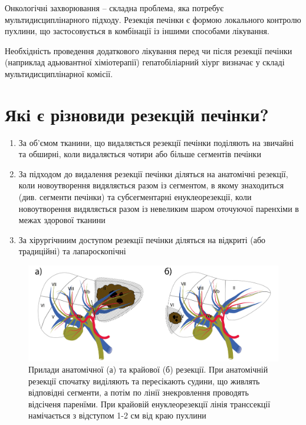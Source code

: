 \begin{tcolorbox}[width=\textwidth,colback=red!5!white,colframe=red!75!black]    
Онкологічні захворювання -- складна проблема, яка потребує мультидисциплінарного підходу. Резекція печінки є формою локального контролю пухлини, що  застосовується в комбінації із іншими способами лікування. 
\end{tcolorbox}    


Необхідність проведення додаткового лікування перед чи після резекції печінки (наприклад адьювантної хіміотерапії) гепатобіліарний хіург визначає у складі  мультидисциплінарної комісії.



\section{Які є різновиди резекцій печінки?}

\begin{enumerate}
    \item За об’ємом тканини, що видаляється резекції печінки поділяють на звичайні та обширні, коли видаляється чотири або більше сегментів печінки
    \item За підходом до видалення резекції печінки діляться на анатомічні резекції, коли новоутворення видяляється разом із сегментом, в якому знаходиться (див. сегменти печінки) та субсегментарні енуклеорезекції, коли новоутворення видяляється разом із невеликим шаром оточуючої паренхіми в межах здорової тканини
    \item За хірургічниим доступом резекції печінки діляться на відкриті (або традиційні) та лапароскопічні 
\end{enumerate}

\begin{figure}
  \includegraphics[width=\linewidth]{Figures/Anatomical vs marginal_Horizontal.png}
  \caption{Прилади анатомічної (а) та крайової (б) резекції. При анатомічній резекції спочатку виділяють та пересікають судини, що живлять відповідні сегменти, а потім по лінії знекровлення проводять відсіченя паренїми. При крайовій енуклеорезекції лінія транссекції намічається з відступом 1-2 см від краю пухлини}
  \label{fig:textfig}
\end{figure}

